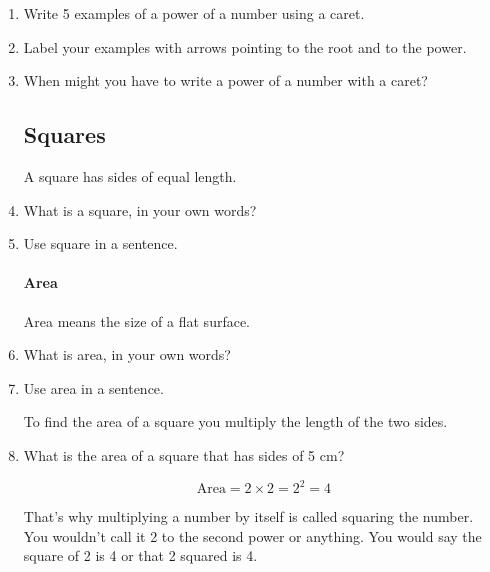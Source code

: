 \documentclass[12pt]{article}
\begin{document}
\begin{enumerate}
\item Write 5 examples of a power of a number using a caret.
\item Label your examples with arrows pointing to the root and to the power.
\item When might you have to write a power of a number with a caret?


\subsection*{Squares}

A square has sides of equal length.\\

\item What is a square, in your own words?
\item Use square in a sentence.

\paragraph{Area}
Area means the size of a flat surface.\\

\item What is area, in your own words?
\item Use area in a sentence.

To find the area of a square you multiply the length of the two sides.\\

\item What is the area of a square that has sides of 5 cm?

\begin{figure}
  \centering
  \quad
  \begin{minipage}{5cm}
    \[
    \text{Area} = 2 \times 2 = 2^2 = 4
    \]
  \end{minipage}
\end{figure}

That's why multiplying a number by itself is called squaring the number.\\

You wouldn't call it 2 to the second power or anything. You would say the square of 2 is 4 or that 2 squared is 4.


\end{enumerate}
\end{document}
